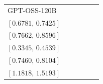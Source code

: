 \begin{tabular*}{\linewidth}{@{\extracolsep{\fill}}lccccc@{}}
GPT-OSS-120B & \begin{tabular}[t]{@{}c@{}}\(0.7103\)\\\([0.6781,\,0.7425]\)\end{tabular} & \begin{tabular}[t]{@{}c@{}}\(0.8138\)\\\([0.7662,\,0.8596]\)\end{tabular} & \begin{tabular}[t]{@{}c@{}}\(0.3931\)\\\([0.3345,\,0.4539]\)\end{tabular} & \begin{tabular}[t]{@{}c@{}}\(0.7785\)\\\([0.7460,\,0.8104]\)\end{tabular} & \begin{tabular}[t]{@{}c@{}}\(1.3498\)\\\([1.1818,\,1.5193]\)\end{tabular}\\[2pt]
\bottomrule
\end{tabular*}
\endgroup
